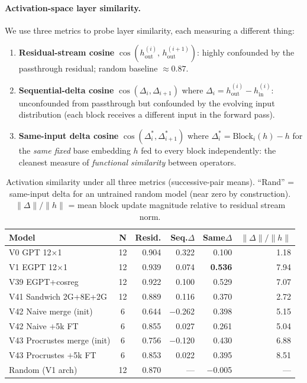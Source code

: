 \paragraph{Activation-space layer similarity.}
We use three metrics to probe layer similarity, each measuring a different thing:
\begin{enumerate}
  \item \textbf{Residual-stream cosine} $\cos(h_\mathrm{out}^{(i)},\, h_\mathrm{out}^{(i+1)})$:
        highly confounded by the passthrough residual; random baseline $\approx 0.87$.
  \item \textbf{Sequential-delta cosine} $\cos(\Delta_i, \Delta_{i+1})$ where $\Delta_i = h_\mathrm{out}^{(i)} - h_\mathrm{in}^{(i)}$:
        unconfounded from passthrough but confounded by the evolving input distribution
        (each block receives a different input in the forward pass).
  \item \textbf{Same-input delta cosine} $\cos(\Delta_i^*, \Delta_{i+1}^*)$ where
        $\Delta_i^* = \mathrm{Block}_i(h) - h$ for the \emph{same fixed} base embedding $h$
        fed to every block independently:
        the cleanest measure of \emph{functional similarity} between operators.
\end{enumerate}

\begin{table}[h]
\centering
\caption{Activation similarity under all three metrics (successive-pair means).
  ``Rand'' = same-input delta for an untrained random model (near zero by construction).
  $\|\Delta\|/\|h\|$ = mean block update magnitude relative to residual stream norm.}
\label{tab:act_sim_full}
\small
\begin{tabular}{lcrrrr}
\toprule
\textbf{Model} & \textbf{N} & \textbf{Resid.} & \textbf{Seq.$\Delta$} & \textbf{Same$\Delta$} & $\|\Delta\|/\|h\|$ \\
\midrule
V0 GPT 12$\times$1         & 12 & 0.904 & 0.322 & 0.100 & 1.18 \\
V1 EGPT 12$\times$1        & 12 & 0.939 & 0.074 & \textbf{0.536} & 7.94 \\
V39 EGPT+cosreg            & 12 & 0.922 & 0.100 & 0.529 & 7.07 \\
V41 Sandwich 2G+8E+2G      & 12 & 0.889 & 0.116 & 0.370 & 2.72 \\
\midrule
V42 Naive merge (init)     &  6 & 0.644 & $-$0.262 & 0.398 & 5.15 \\
V42 Naive $+$5k FT         &  6 & 0.855 & 0.027 & 0.261 & 5.04 \\
V43 Procrustes merge (init) & 6 & 0.756 & $-$0.120 & 0.430 & 6.88 \\
V43 Procrustes $+$5k FT    &  6 & 0.853 & 0.022 & 0.395 & 8.51 \\
\midrule
Random (V1 arch)           & 12 & 0.870 & --- & $-$0.005 & --- \\
\bottomrule
\end{tabular}
\end{table}

